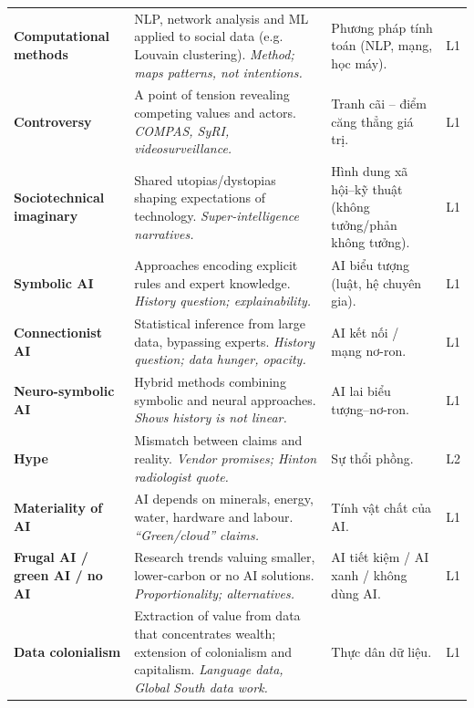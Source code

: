\documentclass[11pt,a4paper]{article}
\begin{document}
{\begin{longtable}{>{\RaggedRight\arraybackslash\bfseries}p{3.3cm}>{\RaggedRight\arraybackslash}p{5.1cm}>{\RaggedRight\arraybackslash}p{5.1cm}>{\centering\arraybackslash}p{0.8cm}}
Computational methods & NLP, network analysis and ML applied to social data (e.g. Louvain clustering). \newline\textit{\color{teal}Method; maps patterns, not intentions.} & \textcolor{tipc}{Phương pháp tính toán (NLP, mạng, học máy).} & L1\\[3pt]
Controversy & A point of tension revealing competing values and actors. \newline\textit{\color{teal}COMPAS, SyRI, videosurveillance.} & \textcolor{tipc}{Tranh cãi – điểm căng thẳng giá trị.} & L1\\[3pt]
Sociotechnical imaginary & Shared utopias/dystopias shaping expectations of technology. \newline\textit{\color{teal}Super-intelligence narratives.} & \textcolor{tipc}{Hình dung xã hội–kỹ thuật (không tưởng/phản không tưởng).} & L1\\[3pt]
Symbolic AI & Approaches encoding explicit rules and expert knowledge. \newline\textit{\color{teal}History question; explainability.} & \textcolor{tipc}{AI biểu tượng (luật, hệ chuyên gia).} & L1\\[3pt]
Connectionist AI & Statistical inference from large data, bypassing experts. \newline\textit{\color{teal}History question; data hunger, opacity.} & \textcolor{tipc}{AI kết nối / mạng nơ-ron.} & L1\\[3pt]
Neuro-symbolic AI & Hybrid methods combining symbolic and neural approaches. \newline\textit{\color{teal}Shows history is not linear.} & \textcolor{tipc}{AI lai biểu tượng–nơ-ron.} & L1\\[3pt]
Hype & Mismatch between claims and reality. \newline\textit{\color{teal}Vendor promises; Hinton radiologist quote.} & \textcolor{tipc}{Sự thổi phồng.} & L2\\[3pt]
Materiality of AI & AI depends on minerals, energy, water, hardware and labour. \newline\textit{\color{teal}“Green/cloud” claims.} & \textcolor{tipc}{Tính vật chất của AI.} & L1\\[3pt]
Frugal AI / green AI / no AI & Research trends valuing smaller, lower-carbon or no AI solutions. \newline\textit{\color{teal}Proportionality; alternatives.} & \textcolor{tipc}{AI tiết kiệm / AI xanh / không dùng AI.} & L1\\[3pt]
Data colonialism & Extraction of value from data that concentrates wealth; extension of colonialism and capitalism. \newline\textit{\color{teal}Language data, Global South data work.} & \textcolor{tipc}{Thực dân dữ liệu.} & L1\\[3pt]

\end{longtable}}
\end{document}
